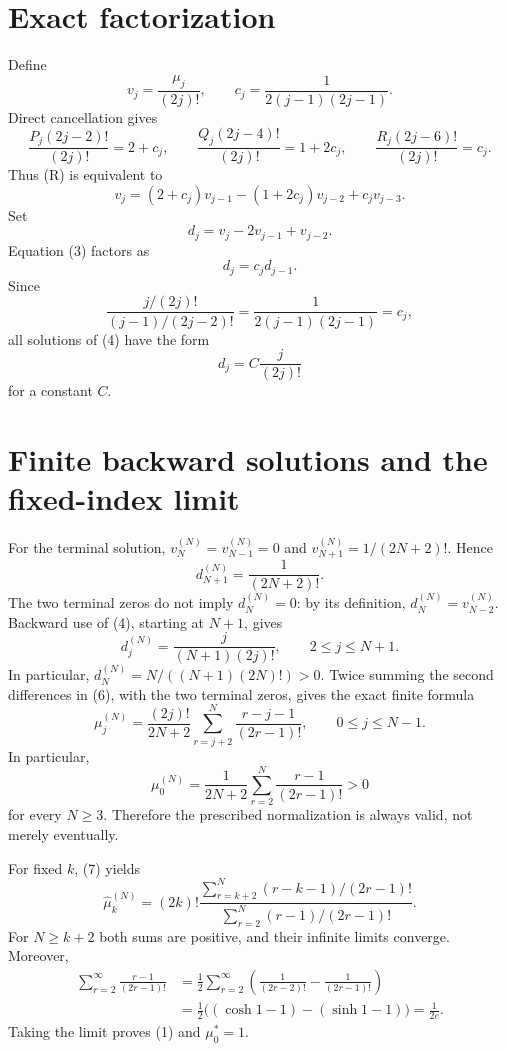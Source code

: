 \documentclass[11pt]{article}
\begin{document}
\section{Exact factorization}

Define
\[
v_j=\frac{\mu_j}{(2j)!},
\qquad
c_j=\frac{1}{2(j-1)(2j-1)}.
\]
Direct cancellation gives
\[
\frac{P_j(2j-2)!}{(2j)!}=2+c_j,\qquad
\frac{Q_j(2j-4)!}{(2j)!}=1+2c_j,\qquad
\frac{R_j(2j-6)!}{(2j)!}=c_j.
\]
Thus (R) is equivalent to
\begin{equation}
v_j=(2+c_j)v_{j-1}-(1+2c_j)v_{j-2}+c_jv_{j-3}.
\tag{3}
\end{equation}
Set
\[
d_j=v_j-2v_{j-1}+v_{j-2}.
\]
Equation (3) factors as
\begin{equation}
d_j=c_jd_{j-1}.
\tag{4}
\end{equation}
Since
\[
\frac{j/(2j)!}{(j-1)/(2j-2)!}
=\frac{1}{2(j-1)(2j-1)}=c_j,
\]
all solutions of (4) have the form
\begin{equation}
d_j=C\frac{j}{(2j)!}
\tag{5}
\end{equation}
for a constant \(C\).

\section{Finite backward solutions and the fixed-index limit}

For the terminal solution, \(v_N^{(N)}=v_{N-1}^{(N)}=0\) and
\(v_{N+1}^{(N)}=1/(2N+2)!\).  Hence
\[
d_{N+1}^{(N)}=\frac{1}{(2N+2)!}.
\]
The two terminal zeros do not imply $d_N^{(N)}=0$: by its definition,
$d_N^{(N)}=v_{N-2}^{(N)}$.  Backward use of (4), starting at $N+1$, gives
\begin{equation}
d_j^{(N)}=\frac{j}{(N+1)(2j)!},
\qquad 2\leq j\leq N+1.
\tag{6}
\end{equation}
In particular, $d_N^{(N)}=N/((N+1)(2N)!)>0$.
Twice summing the second differences in (6), with the two terminal zeros,
gives the exact finite formula
\begin{equation}
\mu_j^{(N)}
=\frac{(2j)!}{2N+2}\sum_{r=j+2}^{N}
\frac{r-j-1}{(2r-1)!},
\qquad 0\leq j\leq N-1.
\tag{7}
\end{equation}
In particular,
\[
\mu_0^{(N)}=\frac{1}{2N+2}
\sum_{r=2}^{N}\frac{r-1}{(2r-1)!}>0
\]
for every \(N\geq 3\).  Therefore the prescribed normalization is always
valid, not merely eventually.

For fixed \(k\), (7) yields
\[
\widehat\mu_k^{(N)}=(2k)!
\frac{\displaystyle\sum_{r=k+2}^{N}(r-k-1)/(2r-1)!}
{\displaystyle\sum_{r=2}^{N}(r-1)/(2r-1)!}.
\]
For $N\geq k+2$ both sums are positive, and their infinite limits converge.  Moreover,
\begin{align*}
\sum_{r=2}^{\infty}\frac{r-1}{(2r-1)!}
&=\frac12\sum_{r=2}^{\infty}
\left(\frac{1}{(2r-2)!}-\frac{1}{(2r-1)!}\right)\\
&=\frac12\bigl((\cosh 1-1)-(\sinh 1-1)\bigr)
=\frac{1}{2e}.
\end{align*}
Taking the limit proves (1) and \(\mu_0^*=1\).
\end{document}
